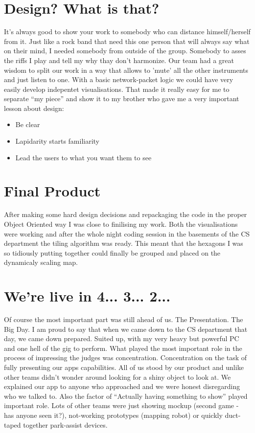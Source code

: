 \documentclass[12pt,a4paper]{article}
\begin{document}
    \section*{Design? What is that?}
	It's always good to show your work to somebody who can distance himself/herself from it. Just like a rock band that need this one person that will always say what on their mind, I needed somebody from outside of the group.
	Somebody to asses the riffs I play and tell my why thay don't harmonize. Our team had a great wisdom to split our work in a way that allows to 'mute' all the other instruments and just listen to one. With a basic network-packet logic we could have very easily develop indepentet visualisations.
	That made it really easy for me to separate ``my piece'' and show it to my brother who gave me a very important lesson about design:
	\begin{itemize}
		\item Be clear
		\item Lapidarity starts familiarity
		\item Lead the users to what you want them to see
	\end{itemize}
      

        \section*{Final Product}
                After making some hard design decisions and repackaging the code in the proper Object Oriented way I was close to finilising my work. Both the visualisations were working and after the whole night coding session in the basements of the CS department the tiling algorithm was ready. This meant that the hexagons I was so tidiously putting together could finally be grouped and placed on the dynamicaly scaling map.

        \section*{We're live in 4... 3... 2...}
                Of course the most important part was still ahead of us. The Presentation. The Big Day. I am proud to say that when we came down to the CS department that day, we came down prepared. Suited up, with my very heavy but powerful PC and one hell of the gig to perform. What played the most important role in the process of impressing the judges was concentration. Concentration on the task of fully presenting our apps capabilities. All of us stood by our product and unlike other teams didn't wonder around looking for a shiny object to look at. We explained our app to anyone who approached and we were honest disregarding who we talked to. Also the factor of ``Actually having something to show'' played important role. Lots of other teams were just showing mockup (second game - has anyone seen it?), not-working prototypes (mapping robot) or quickly duct-taped together park-assist devices.
\end{document}
